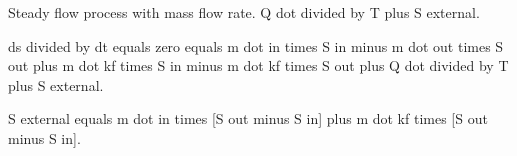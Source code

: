 Steady flow process with mass flow rate.  
Q dot divided by T plus S external.  

ds divided by dt equals zero equals m dot in times S in minus m dot out times S out plus m dot kf times S in minus m dot kf times S out plus Q dot divided by T plus S external.  

S external equals m dot in times [S out minus S in] plus m dot kf times [S out minus S in].